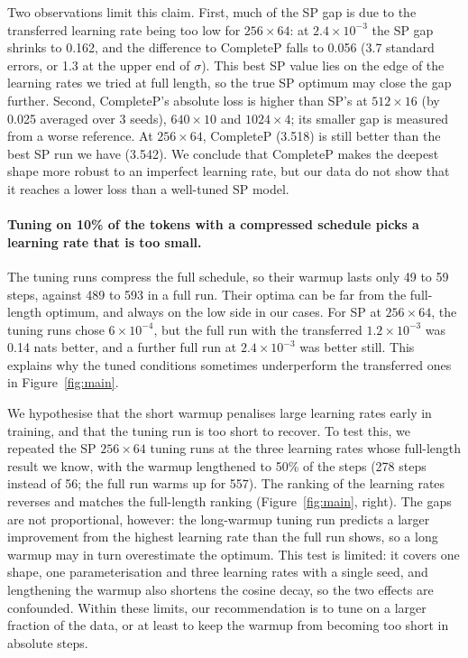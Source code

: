 \documentclass[10pt,twocolumn,a4paper]{article}
\newcommand{\sh}[2]{\ensuremath{#1{\times}#2}}  %
\begin{document}
Two observations limit this claim. First, much of the SP gap is due to the transferred learning rate being too low for \sh{256}{64}: at $2.4\times10^{-3}$ the SP gap shrinks to 0.162, and the difference to CompleteP falls to 0.056 (3.7 standard errors, or 1.3 at the upper end of $\sigma$). This best SP value lies on the edge of the learning rates we tried at full length, so the true SP optimum may close the gap further. Second, CompleteP's absolute loss is higher than SP's at \sh{512}{16} (by 0.025 averaged over 3 seeds), \sh{640}{10} and \sh{1024}{4}; its smaller gap is measured from a worse reference. At \sh{256}{64}, CompleteP (3.518) is still better than the best SP run we have (3.542). We conclude that CompleteP makes the deepest shape more robust to an imperfect learning rate, but our data do not show that it reaches a lower loss than a well-tuned SP model.

\paragraph{Tuning on 10\% of the tokens with a compressed schedule picks a learning rate that is too small.} The tuning runs compress the full schedule, so their warmup lasts only 49 to 59 steps, against 489 to 593 in a full run. Their optima can be far from the full-length optimum, and always on the low side in our cases. For SP at \sh{256}{64}, the tuning runs chose $6\times10^{-4}$, but the full run with the transferred $1.2\times10^{-3}$ was 0.14 nats better, and a further full run at $2.4\times10^{-3}$ was better still. This explains why the tuned conditions sometimes underperform the transferred ones in Figure~\ref{fig:main}.

We hypothesise that the short warmup penalises large learning rates early in training, and that the tuning run is too short to recover. To test this, we repeated the SP \sh{256}{64} tuning runs at the three learning rates whose full-length result we know, with the warmup lengthened to 50\% of the steps (278 steps instead of 56; the full run warms up for 557). The ranking of the learning rates reverses and matches the full-length ranking (Figure~\ref{fig:main}, right). The gaps are not proportional, however: the long-warmup tuning run predicts a larger improvement from the highest learning rate than the full run shows, so a long warmup may in turn overestimate the optimum. This test is limited: it covers one shape, one parameterisation and three learning rates with a single seed, and lengthening the warmup also shortens the cosine decay, so the two effects are confounded. Within these limits, our recommendation is to tune on a larger fraction of the data, or at least to keep the warmup from becoming too short in absolute steps.
\end{document}
